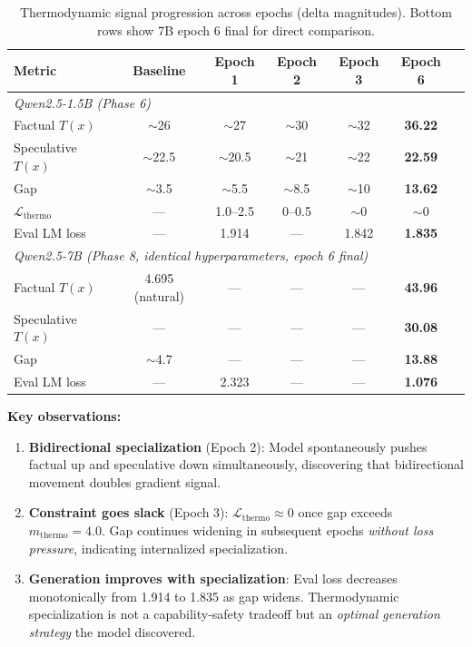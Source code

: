\documentclass[11pt,a4paper]{article}
\begin{document}
\begin{table}[h]
\centering
\caption{Thermodynamic signal progression across epochs (delta magnitudes). Bottom rows show 7B epoch 6 final for direct comparison.}
\label{tab:thermo_progression}
\begin{tabular}{lcccccc}
\toprule
Metric & Baseline & Epoch 1 & Epoch 2 & Epoch 3 & Epoch 6 \\
\midrule
\multicolumn{6}{l}{\textit{Qwen2.5-1.5B (Phase 6)}} \\
Factual $T(x)$ & $\sim$26 & $\sim$27 & $\sim$30 & $\sim$32 & \textbf{36.22} \\
Speculative $T(x)$ & $\sim$22.5 & $\sim$20.5 & $\sim$21 & $\sim$22 & \textbf{22.59} \\
Gap & $\sim$3.5 & $\sim$5.5 & $\sim$8.5 & $\sim$10 & \textbf{13.62} \\
$\mathcal{L}_\text{thermo}$ & --- & 1.0--2.5 & 0--0.5 & $\sim$0 & $\sim$0 \\
Eval LM loss & --- & 1.914 & --- & 1.842 & \textbf{1.835} \\
\midrule
\multicolumn{6}{l}{\textit{Qwen2.5-7B (Phase 8, identical hyperparameters, epoch 6 final)}} \\
Factual $T(x)$ & 4.695 (natural) & --- & --- & --- & \textbf{43.96} \\
Speculative $T(x)$ & --- & --- & --- & --- & \textbf{30.08} \\
Gap & $\sim$4.7 & --- & --- & --- & \textbf{13.88} \\
Eval LM loss & --- & 2.323 & --- & --- & \textbf{1.076} \\
\bottomrule
\end{tabular}
\end{table}

\textbf{Key observations:}

\begin{enumerate}
\item \textbf{Bidirectional specialization} (Epoch 2): Model spontaneously pushes factual up and speculative down simultaneously, discovering that bidirectional movement doubles gradient signal.

\item \textbf{Constraint goes slack} (Epoch 3): $\mathcal{L}_\text{thermo} \approx 0$ once gap exceeds $m_\text{thermo} = 4.0$. Gap continues widening in subsequent epochs \emph{without loss pressure}, indicating internalized specialization.

\item \textbf{Generation improves with specialization}: Eval loss decreases monotonically from 1.914 to 1.835 as gap widens. Thermodynamic specialization is not a capability-safety tradeoff but an \emph{optimal generation strategy} the model discovered.
\end{enumerate}
\end{document}
